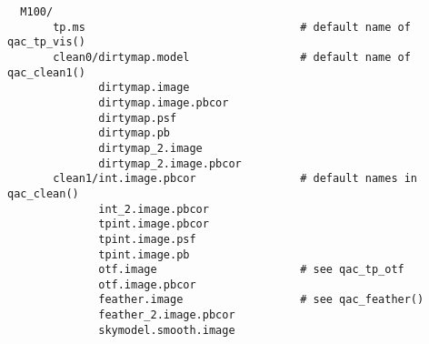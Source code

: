 \documentclass[12pt,a4paper]{article}
\begin{document}
\begin{verbatim}
  M100/
       tp.ms                                 # default name of qac_tp_vis()
       clean0/dirtymap.model                 # default name of qac_clean1()
              dirtymap.image
              dirtymap.image.pbcor
              dirtymap.psf
              dirtymap.pb
              dirtymap_2.image
              dirtymap_2.image.pbcor
       clean1/int.image.pbcor                # default names in qac_clean()
              int_2.image.pbcor
              tpint.image.pbcor
              tpint.image.psf
              tpint.image.pb
              otf.image                      # see qac_tp_otf
              otf.image.pbcor
              feather.image                  # see qac_feather()
              feather_2.image.pbcor
              skymodel.smooth.image
             

       
\end{verbatim}
\end{document}
